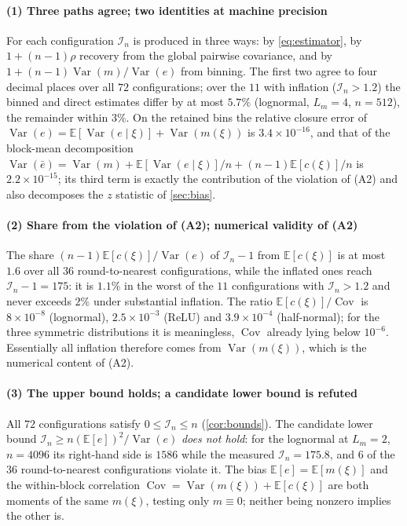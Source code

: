 \documentclass[review,hidelinks,oneeqnum,onetabnum,onefignum,onethmnum]{siamart251216}
\begin{document}
\paragraph{(1) Three paths agree; two identities at machine precision} For each
configuration $\mathcal I_n$ is produced in three ways: by \cref{eq:estimator},
by $1+(n-1)\rho$ recovery from the global pairwise covariance, and by
$1+(n-1)\operatorname{Var}(m)/\operatorname{Var}(e)$ from binning. The first two
agree to four decimal places over all $72$ configurations; over the $11$ with
inflation ($\mathcal I_n>1.2$) the binned and direct estimates differ by at most
$5.7\%$ (lognormal, $L_m=4$, $n=512$), the remainder within $3\%$. On the retained
bins the relative closure error of
$\operatorname{Var}(e)=\mathbb{E}[\operatorname{Var}(e\mid\xi)]+\operatorname{Var}(m(\xi))$
is $3.4\times10^{-16}$, and that of the block-mean decomposition
$\operatorname{Var}(\bar e)=\operatorname{Var}(m)+\mathbb{E}[\operatorname{Var}(e\mid\xi)]/n+(n-1)\mathbb{E}[c(\xi)]/n$
is $2.2\times10^{-15}$; its third term is exactly the contribution of the
violation of (A2) and also decomposes the $z$ statistic of \cref{sec:bias}.

\paragraph{(2) Share from the violation of (A2); numerical validity of (A2)} The
share $(n-1)\mathbb{E}[c(\xi)]/\operatorname{Var}(e)$ of $\mathcal I_n-1$ from
$\mathbb{E}[c(\xi)]$ is at most $1.6$ over all $36$ round-to-nearest
configurations, while the inflated ones reach $\mathcal I_n-1=175$: it is $1.1\%$
in the worst of the $11$ configurations with $\mathcal I_n>1.2$ and never exceeds
$2\%$ under substantial inflation. The ratio
$\mathbb{E}[c(\xi)]/\operatorname{Cov}$ is $8\times10^{-8}$ (lognormal),
$2.5\times10^{-3}$ (ReLU) and $3.9\times10^{-4}$ (half-normal); for the three
symmetric distributions it is meaningless, $\operatorname{Cov}$ already lying below
$10^{-6}$. Essentially all inflation therefore comes from
$\operatorname{Var}(m(\xi))$, which is the numerical content of (A2).

\paragraph{(3) The upper bound holds; a candidate lower bound is refuted} All $72$
configurations satisfy $0\le\mathcal I_n\le n$ (\cref{cor:bounds}). The candidate
lower bound $\mathcal I_n\ge n(\mathbb{E}[e])^2/\operatorname{Var}(e)$ \emph{does
not hold}: for the lognormal at $L_m=2$, $n=4096$ its right-hand side is $1586$
while the measured $\mathcal I_n=175.8$, and $6$ of the $36$ round-to-nearest
configurations violate it. The bias $\mathbb{E}[e]=\mathbb{E}[m(\xi)]$ and the
within-block correlation
$\operatorname{Cov}=\operatorname{Var}(m(\xi))+\mathbb{E}[c(\xi)]$ are both moments
of the same $m(\xi)$, testing only $m\equiv0$; neither being nonzero implies the
other is.
\end{document}
